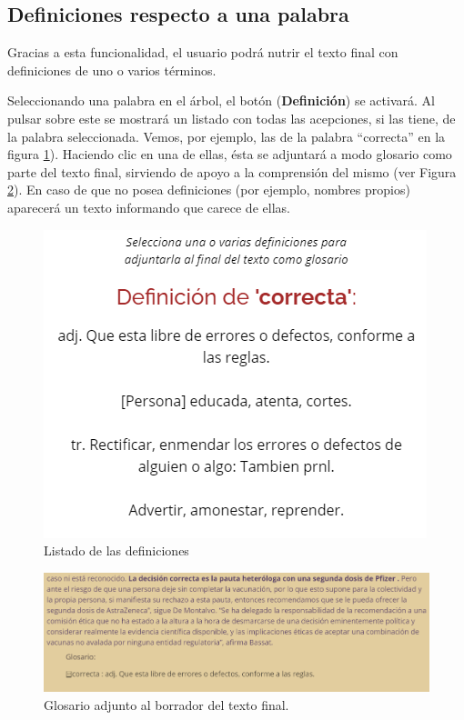 \subsection{Definiciones respecto a una palabra}
 Gracias a esta funcionalidad, el usuario podrá nutrir el texto final con definiciones de uno o varios términos. 
 
 Seleccionando una palabra en el árbol, el botón (\textbf{Definición}) se activará. Al pulsar sobre este se mostrará un listado con todas las acepciones, si las tiene, de la palabra seleccionada. Vemos, por ejemplo, las de la palabra ``correcta'' en la figura \ref{fig:definiciones}). Haciendo clic en una de ellas, ésta se adjuntará a modo glosario como parte del texto final, sirviendo de apoyo a la comprensión del mismo (ver Figura \ref{fig:definicionesBorrador}). En caso de que no posea definiciones (por ejemplo, nombres propios) aparecerá un texto informando que carece de ellas.
 	 \begin{figure}[h!]
 	\centering
 	
 	
 	\includegraphics[scale=0.8]{Imagenes/Figuras/DefinicionesPersonas}
 	
 	
 	\caption{Listado de las definiciones}
 	\label{fig:definiciones}
 \end{figure}
 	 \begin{figure}[h!]
	\centering
	
	
	\includegraphics[scale=0.8]{Imagenes/Figuras/GlosarioBorrador}
	
	
	\caption{Glosario adjunto al borrador del texto final.}
	\label{fig:definicionesBorrador}
\end{figure}
